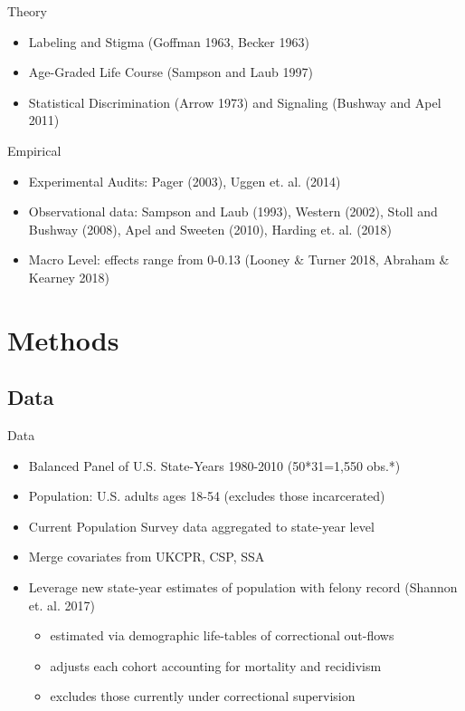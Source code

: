 \documentclass{beamer}\usepackage[]{graphicx}\usepackage[]{color}
\begin{document}
\begin{frame}

\begin{block}{Theory}
\begin{itemize}
\item Labeling and Stigma (Goffman 1963, Becker 1963)
\item Age-Graded Life Course (Sampson and Laub 1997)
\item Statistical Discrimination (Arrow 1973) and Signaling (Bushway and Apel 2011)
\end{itemize}
\end{block}

\begin{block}{Empirical}
\begin{itemize}
\item Experimental Audits: Pager (2003), Uggen et. al. (2014)
\item Observational data: Sampson and Laub (1993), Western (2002), Stoll and Bushway (2008), Apel and Sweeten (2010), Harding et. al. (2018)
\item Macro Level: effects range from 0-0.13 (Looney \& Turner 2018, Abraham \& Kearney 2018)
\end{itemize}
\end{block}

\end{frame}

\section{Methods}
\subsection{Data}

\begin{frame}{Data}
\begin{block}{}
\begin{itemize}

\item Balanced Panel of U.S. State-Years 1980-2010 (50*31=1,550 obs.*)
\item Population: U.S. adults ages 18-54 (excludes those incarcerated)
\item Current Population Survey data aggregated to state-year level
\item Merge covariates from UKCPR, CSP, SSA
\item Leverage new state-year estimates of population with felony record (Shannon et. al. 2017)
  \begin{itemize}
  \item estimated via demographic life-tables of correctional out-flows 
  \item adjusts each cohort accounting for mortality and recidivism
  \item excludes those currently under correctional supervision
  \end{itemize}
\end{itemize}
\end{block}
\end{frame}
\end{document}
